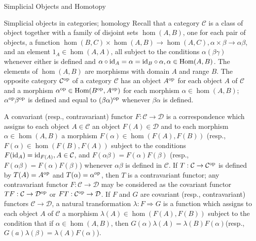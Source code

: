 \documentclass[a4,20pt,twosides]{book}
\begin{document}
\begin{chapter}{Simplicial Objects and Homotopy}
\begin{section}{Simplicial objects in categories; homology}
	Recall that a category $\mathcal{C}$ is a class of object together with a family of disjoint sets $\hom(A,B)$, one for each pair of objects, a function $\hom(B,C) \times \hom(A,B) \rightarrow \hom(A,C), \alpha \times \beta \rightarrow \alpha \beta$, and an element $1_A \in  \hom(A,A)$, all subject to the conditions $\alpha(\beta \gamma)$ whenever either is defined and $\alpha \circ \text{id}_{A} = \alpha = \text{id}_{B} \circ \alpha, \alpha \in \text{Hom}(A,B)$. The elements of $\hom(A,B)$ are morphisms with domain $A$ and range $B$. The opposite category $\mathcal{C}^{\text{op}}$ of a category $\mathcal{C}$ has an object $A^{\text{op}}$ for each object $A$ of $\mathcal{C}$ and a morphism $\alpha^{\text{op}} \in \text{Hom}(B^{\text{op}}, A^{\text{op}})$ for each morphism $\alpha \in \hom(A,B)$; $\alpha^{\text{op}} \beta^{\text{op}}$ is defined and equal to $(\beta \alpha)^{\text{op}}$ whenever $\beta \alpha$ is defined.
	
	A convariant (resp., contravariant) functor $F: \mathcal{C} \rightarrow \mathcal{D}$ is a correspondence which assigns to each object $A \in \mathcal{C}$ an object $F(A) \in \mathcal{D}$ and to each morphism $\alpha \in \hom(A,B)$ a morphism $F(\alpha) \in \hom(F(A),F(B))$ (resp., $F(\alpha) \in \hom(F(B),F(A))$ subject to the conditions $F(\text{id}_{A})= \text{id}_{F(A)}, A \in \mathcal{C}$, and $F(\alpha \beta)= F(\alpha)F(\beta)$ (resp., $F(\alpha \beta)=F(\alpha)F(\beta)$) whenever $\alpha \beta$ is defined in $\mathcal{C}$. If $T: \mathcal{C} \rightarrow \mathcal{C}^{\text{op}}$ is defined by $T(A) = A^{\text{op}}$ and $T(\alpha)= \alpha^{\text{op}}$, then $T$ is a contravariant functor; any contravariant functor $F: \mathcal{C} \rightarrow \mathcal{D}$ may be considered as the covariant functor $TF: \mathcal{C} \rightarrow \mathcal{D}^{\text{op}}$ or $FT: \mathcal{C}^{\text{op}} \rightarrow \mathcal{D}$. If $F$ and $G$ are covariant (resp., contravariant) functors $\mathcal{C} \rightarrow \mathcal{D}$, a natural transformation $\lambda : F \Rightarrow G$ is a function which assigns to each object $A$ of $\mathcal{C}$ a morphism $\lambda(A) \in \hom(F(A),F(B))$ subject to the condition that if $\alpha \in \hom(A,B)$, then $G(\alpha) \lambda(A) = \lambda(B)F(\alpha)$(resp., $G(a) \lambda(\beta) = \lambda(A)F(\alpha)$).
	

\end{section}
\end{chapter}
\end{document}
